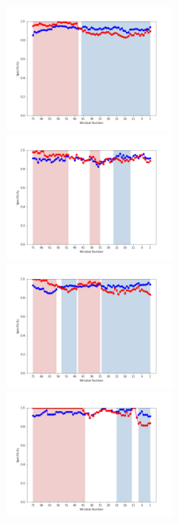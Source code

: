 \documentclass[11pt]{jreport}
\begin{document}
\begin{figure}[H]
\begin{minipage}{\textwidth}
\vspace{0.08\textheight}
\begin{center}
    \includegraphics[width=0.495\textwidth]{Uenaka_fig/RQ2_result/Nova_merge_Specificity.pdf}
    \includegraphics[width=0.495\textwidth]{Uenaka_fig/RQ2_result/Neutron_merge_Specificity.pdf}
    \includegraphics[width=0.495\textwidth]{Uenaka_fig/RQ2_result/Cinder_merge_Specificity.pdf}
    \includegraphics[width=0.495\textwidth]{Uenaka_fig/RQ2_result/Keystone_merge_Specificity.pdf}

\end{center}
\end{minipage}
\end{figure}
\end{document}
